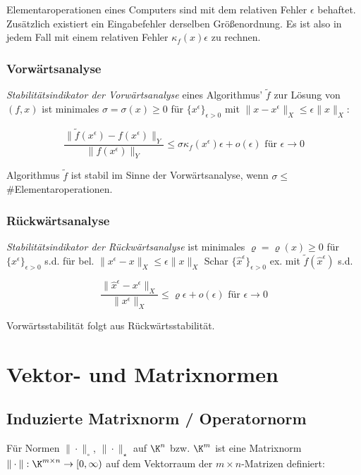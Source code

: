 Elementaroperationen eines Computers sind mit dem relativen Fehler $\epsilon$ behaftet. Zusätzlich existiert ein Eingabefehler derselben Größenordnung. Es ist also in jedem Fall mit einem relativen Fehler $\kappa_f(x)\epsilon$ zu rechnen.

\subsubsection*{Vorwärtsanalyse}

\emph{Stabilitätsindikator der Vorwärtsanalyse} eines Algorithmus' $\tilde f$ zur Lösung von $(f,x)$ ist minimales $\sigma = \sigma(x) \geq 0$ für $\{x^\epsilon\}_{\epsilon > 0}$ mit $\|x-x^\epsilon\|_X \leq \epsilon \|x\|_X$:

\vspace{-4mm}
$$\frac{\|\tilde f(x^\epsilon) - f(x^\epsilon)\|_Y}{\|f(x^\epsilon)\|_Y} \leq \sigma \kappa_f(x^\epsilon)\epsilon + o(\epsilon) \text{ für } \epsilon \to 0$$

Algorithmus $\tilde f$ ist stabil im Sinne der Vorwärtsanalyse, wenn $\sigma \leq$ \#Elementaroperationen.

\subsubsection*{Rückwärtsanalyse}

\emph{Stabilitätsindikator der Rückwärtsanalyse} ist minimales $\varrho = \varrho(x) \geq 0$ für $\{x^\epsilon\}_{\epsilon > 0}$ s.d. für bel. $\|x^\epsilon - x\|_X \leq \epsilon \|x\|_X$ Schar $\{\hat x^\epsilon\}_{\epsilon > 0}$ ex. mit $\tilde f(\hat x^\epsilon)$ s.d.

\vspace{-2mm}
$$\frac{\|\hat x^\epsilon - x^\epsilon\|_X}{\|x^\epsilon\|_X} \leq \varrho\epsilon + o(\epsilon) \text{ für } \epsilon \to 0$$

Vorwärtsstabilität folgt aus Rückwärtsstabilität.

\section*{Vektor- und Matrixnormen}

\subsection*{Induzierte Matrixnorm / Operatornorm}

Für Normen $\| \cdot \|_\circ$, $\| \cdot \|_\star$ auf $\K^n$ bzw. $\K^m$ ist eine Matrixnorm $\| \cdot \| : \K^{m \times n} \rightarrow [0,\infty)$ auf dem Vektorraum der $m \times n$-Matrizen definiert:

